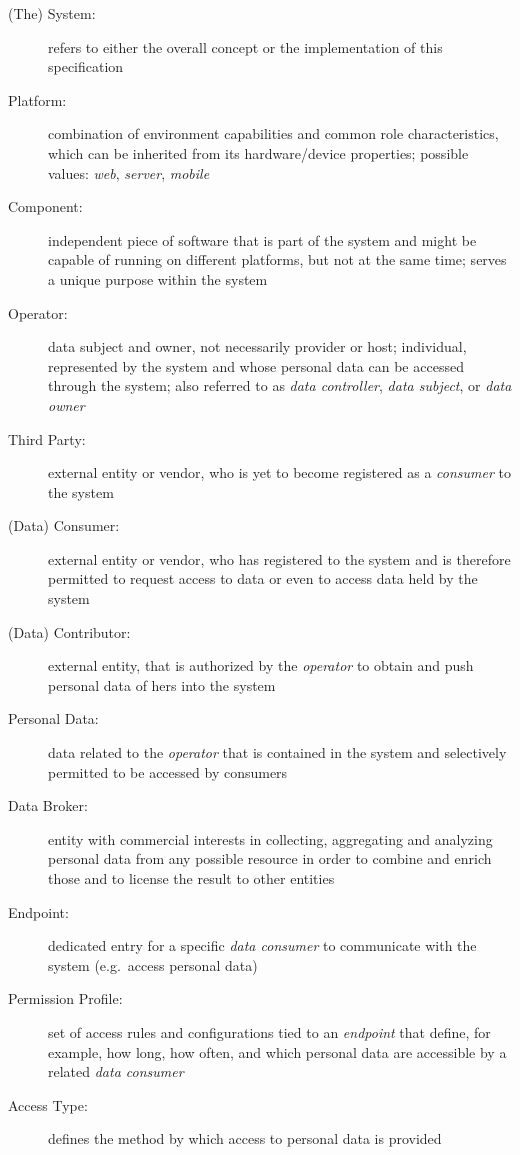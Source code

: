 \documentclass[12pt,english,a4paper,titlepage,cleardoublepage=empty,dottedtoc]{report}
\begin{document}
\begin{description}
\item[\protect\hypertarget{spec_term_system}{}{(The) System}:]
refers to either the overall concept or the implementation of this
specification
\item[\protect\hypertarget{spec_term_platform}{}{Platform}:]
combination of environment capabilities and common role characteristics,
which can be inherited from its hardware/device properties; possible
values: \emph{web}, \emph{server}, \emph{mobile}
\item[\protect\hypertarget{spec_term_component}{}{Component}:]
independent piece of software that is part of the system and might be
capable of running on different platforms, but not at the same time;
serves a unique purpose within the system
\item[\protect\hypertarget{spec_term_operator}{}{Operator}:]
data subject and owner, not necessarily provider or host; individual,
represented by the system and whose personal data can be accessed
through the system; also referred to as \emph{data controller},
\emph{data subject}, or \emph{data owner}
\item[\protect\hypertarget{spec_term_third-party}{}{Third Party}:]
external entity or vendor, who is yet to become registered as a
\emph{consumer} to the system
\item[\protect\hypertarget{spec_term_consumer}{}{(Data) Consumer}:]
external entity or vendor, who has registered to the system and is
therefore permitted to request access to data or even to access data
held by the system
\item[\protect\hypertarget{spec_term_contributor}{}{(Data)
Contributor}:]
external entity, that is authorized by the \emph{operator} to obtain and
push personal data of hers into the system
\item[\protect\hypertarget{spec_term_personal-data}{}{Personal Data}:]
data related to the \emph{operator} that is contained in the system and
selectively permitted to be accessed by consumers
\item[\protect\hypertarget{spec_term_data-broker}{}{Data Broker}:]
entity with commercial interests in collecting, aggregating and
analyzing personal data from any possible resource in order to combine
and enrich those and to license the result to other entities
\item[\protect\hypertarget{spec_term_endpoint}{}{Endpoint}:]
dedicated entry for a specific \emph{data consumer} to communicate with
the system (e.g.~access personal data)
\item[\protect\hypertarget{spec_term_permission-profile}{}{Permission
Profile}:]
set of access rules and configurations tied to an \emph{endpoint} that
define, for example, how long, how often, and which personal data are
accessible by a related \emph{data consumer}
\item[\protect\hypertarget{spec_term_access-type}{}{Access Type}:]
defines the method by which access to personal data is provided
\end{description}
\end{document}
